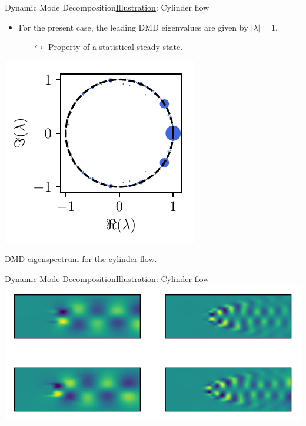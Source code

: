 \documentclass[usenames,dvipsnames,svgnames,10pt,aspectratio=169]{beamer}
\begin{document}
\begin{frame}[t, c]{Dynamic Mode Decomposition}{\underline{Illustration}: Cylinder flow}
	\begin{minipage}{.48\textwidth}
		\begin{itemize}
			\item For the present case, the leading DMD eigenvalues are given by $\vert \lambda \vert = 1$.
			\begin{itemize}
				\item[$\hookrightarrow$] Property of a statistical steady state.
			\end{itemize}
		\end{itemize}
	\end{minipage}%
	\hfill
	\begin{minipage}{.48\textwidth}
		\centering
		\includegraphics[width=.66\textwidth]{DMD_eigenspectrum}

		DMD eigenspectrum for the cylinder flow.
	\end{minipage}

	\vspace{1cm}
\end{frame}

\begin{frame}[t, c]{Dynamic Mode Decomposition}{\underline{Illustration}: Cylinder flow}
	\centering
	\includegraphics[width=.75\textwidth]{cylinder_dmd_modes}

	\vspace{1cm}
\end{frame}
\end{document}
